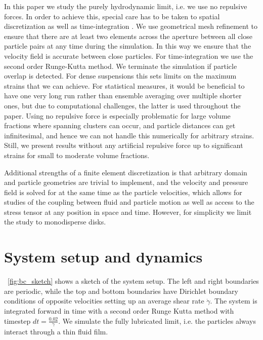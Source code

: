 \documentclass[aps,pre,twocolumn,letterpaper,floatfix,showpacs]{revtex4}
\begin{document}
In this paper we study the purely hydrodynamic limit, i.e. we use no repulsive forces. In order to achieve this, special care has to be taken to spatial discretization as well as time-integration \cite{ekiel2008stokesian}. We use geometrical mesh refinement to ensure that there are at least two elements across the aperture between all close particle pairs at any time during the simulation. In this way we ensure that the velocity field is accurate between close particles. For time-integration we use the second order Runge-Kutta method. We terminate the simulation if particle overlap is detected. For dense suspensions this sets limits on the maximum strains that we can achieve. For statistical measures, it would be beneficial to have one very long run rather than ensemble averaging over multiple shorter ones, but due to computational challenges, the latter is used throughout the paper. Using no repulsive force is especially problematic for large volume fractions where spanning clusters can occur, and particle distances can get infinitesimal, and hence we can not handle this numerically for arbitrary strains. Still, we present results without any artificial repulsive force up to significant strains for small to moderate volume fractions.

Additional strengths of a finite element discretization is that arbitrary domain and particle geometries are trivial to implement, and the velocity and pressure field is solved for at the same time as the particle velocities, which allows for studies of the coupling between fluid and particle motion as well as access to the stress tensor at any position in space and time. However, for simplicity we limit the study to monodisperse disks.

\section{System setup and dynamics} \label{section:dynamics}
\figurename~\ref{fig:bc_sketch} shows a sketch of the system setup. The left and right boundaries are periodic, while the top and bottom boundaries have Dirichlet boundary conditions of opposite velocities setting up an average shear rate $\dot \gamma$. The system is integrated forward in time with a second order Runge Kutta method with timestep $dt = \frac{0.02}{\dot \gamma}$. We simulate the fully lubricated limit, i.e. the particles always interact through a thin fluid film.
\end{document}
